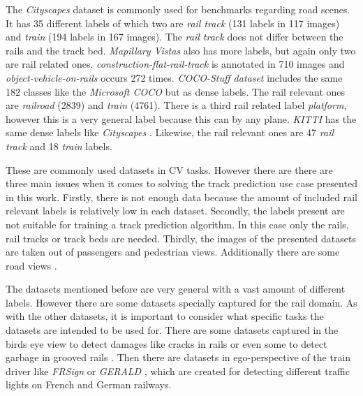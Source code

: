\noindent The \textit{Cityscapes} dataset \cite{cityscapes2016} is commonly used for benchmarks regarding road scenes.
It has 35 different labels of which two are \textit{rail track} (131 labels in 117 images) and \textit{train} (194 labels in 167 images).
The \textit{rail track} does not differ between the rails and the track bed.
\textit{Mapillary Vistas} \cite{mapillaryVistas2017} also has more labels, but again only two are rail related ones.
\textit{construction-flat-rail-track} is annotated in 710 images and \textit{object-vehicle-on-rails} occurs 272 times.
\textit{COCO-Stuff dataset} \cite{COCO-StuffDataset} includes the same 182 classes like the \textit{Microsoft COCO} \cite{Lin2014MicrosoftCC} but as dense labels.
The rail relevant ones are \textit{railroad} (2839) and \textit{train} (4761).
There is a third rail related label \textit{platform}, however this is a very general label because this can by any plane.
\textit{KITTI} \cite{kittiDataset2018} has the same dense labels like \textit{Cityscapes} \cite{cityscapes2016}.
Likewise, the rail relevant ones are 47 \textit{rail track} and 18 \textit{train} labels.

These are commonly used datasets in \ac{CV} tasks. However there are there are three main issues when it comes to solving the track prediction use case presented in this work.
Firstly, there is not enough data because the amount of included rail relevant labels is relatively low in each dataset.
Secondly, the labels present are not suitable for training a track prediction algorithm. In this case only the rails, rail tracks or track beds are needed.
Thirdly, the images of the presented datasets are taken out of passengers and pedestrian views. Additionally there are some road views \cite{Hadded.2022}.

The datasets mentioned before are very general with a vast amount of different labels.
However there are some datasets specially captured for the rail domain.
As with the other datasets, it is important to consider what specific tasks the datasets are intended to be used for.
There are some datasets captured in the birds eye view to detect damages like cracks in rails \cite{rail5k2021} \cite{ma2024cross} or even some to detect garbage in grooved rails \cite{Huang_2021}. Then there are datasets in ego-perspective of the train driver like \textit{FRSign} \cite{Harb2020FRSignAL} or \textit{GERALD} \cite{leibner2023gerald}, which are created for detecting different traffic lights on French and German railways.


